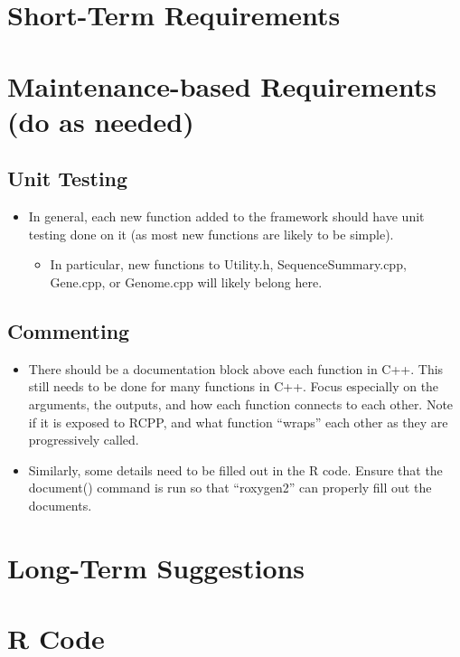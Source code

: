 \documentclass[letter,10pt]{article}
\begin{document}
\section{Short-Term Requirements}

\section{Maintenance-based Requirements (do as needed)}

\subsection{Unit Testing}
\begin{itemize}
    \item In general, each new function added to the framework should have unit testing done on it (as most new functions are likely to be simple).
    \begin{itemize}
        \item In particular, new functions to Utility.h, SequenceSummary.cpp, Gene.cpp, or Genome.cpp will likely belong here.
    \end{itemize}
\end{itemize}

\subsection{Commenting}
\begin{itemize}
    \item There should be a documentation block above each function in C++. This still needs to be done for many functions in C++. Focus especially on the arguments, the outputs, and how each function connects to each other. Note if it is exposed to RCPP, and what function \enquote{wraps} each other as they are progressively called.
    \item Similarly, some details need to be filled out in the R code. Ensure that the document() command is run so that \enquote{roxygen2} can properly fill out the documents.
\end{itemize}

\section{Long-Term Suggestions}


\section{R Code}
\end{document}
